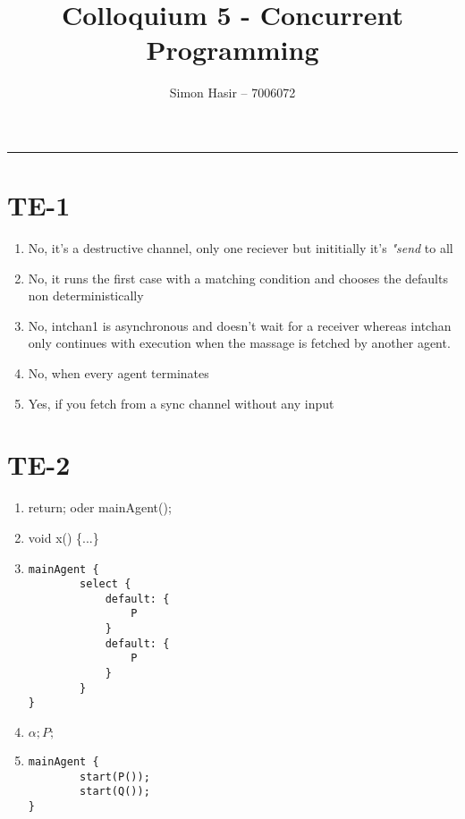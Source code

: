 \documentclass[12pt]{article}
\title{Colloquium 5 - Concurrent Programming}
\author{Simon Hasir -- 7006072}
\begin{document}
             \maketitle
             \noindent
             \rule{\linewidth}{0.4pt}
             
           \section{TE-1}
           \begin{enumerate}[label=(\alph*)]
               \item No, it's a destructive channel, only one reciever but inititially it's \textit{"send} to all 
               \item  No, it runs the first case with a matching condition and chooses the defaults non deterministically
               \item  No, intchan1 is asynchronous and doesn't wait for a receiver whereas intchan only continues with execution when the massage is fetched by another agent.
               \item  No, when every agent terminates
               \item  Yes, if you fetch from a sync channel without any input
           \end{enumerate}
           \section{TE-2}
           \begin{enumerate}[label=(\alph*)]
               \item return; oder mainAgent(){};
               \item void x() \{...\}
               \item \begin{lstlisting}
mainAgent {
        select {
            default: {
                P
            }
            default: {
                P
            }
        }
}
                    \end{lstlisting} 
                \item $\alpha;P;$
                \item \begin{lstlisting}
mainAgent {
        start(P());
        start(Q());
}
                \end{lstlisting} 
            \end{enumerate}
\end{document}
